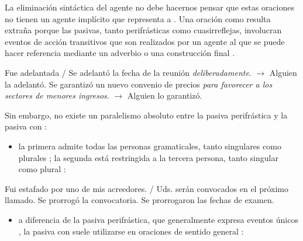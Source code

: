 La eliminación sintáctica del agente no debe hacernos pensar que estas oraciones
no tienen un agente implícito que representa a .
Una oración como  resulta
extraña porque las pasivas, tanto perifrásticas como cuasirreflejas, involucran
eventos de acción transitivos que son realizados por un agente al que se puede
hacer referencia mediante un adverbio  o una
construcción final .

\begin{exe}
  \ex\label{ex:10-deliberadamente} Fue adelantada / Se adelantó la fecha de la
      reunión \textit{deliberadamente}. $\rightarrow$ Alguien la adelantó.
  \ex\label{ex:10-convenio} Se garantizó un nuevo convenio de precios \textit{para
      favorecer a los sectores de menores ingresos}. $\rightarrow$ Alguien lo
      garantizó.
\end{exe}

Sin embargo, no existe un paralelismo absoluto entre la pasiva perifrástica y la
pasiva con :

\begin{itemize}
  \item la primera admite todas las personas gramaticales, tanto singulares
         como plurales ; la
        segunda está restringida a la tercera persona, tanto singular
         como plural :
\end{itemize}

\begin{exe}
  \ex\label{ex:10-estafado} Fui estafado por uno de mis acreedores. /
  \ex\label{ex:10-convocados} Uds. serán convocados en el próximo llamado.
  \ex\label{ex:10-prorrogo} Se prorrogó la convocatoria.
  \ex\label{ex:10-prorrogaron} Se prorrogaron las fechas de examen.
\end{exe}

\begin{itemize}
  \item a diferencia de la pasiva perifrástica, que generalmente expresa eventos
        únicos , la pasiva con  suele utilizarse
        en oraciones de sentido general :
\end{itemize}

